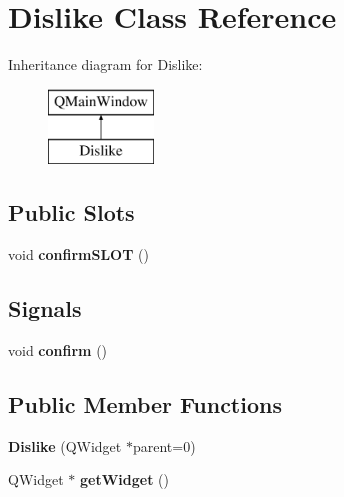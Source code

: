\hypertarget{class_dislike}{}\section{Dislike Class Reference}
\label{class_dislike}
Inheritance diagram for Dislike\+:\begin{figure}[H]
\begin{center}
\leavevmode
\includegraphics[height=2.000000cm]{class_dislike}
\end{center}
\end{figure}
\subsection*{Public Slots}
\begin{DoxyCompactItemize}
\item 
void {\bfseries confirm\+S\+L\+OT} ()\hypertarget{class_dislike_a16fb4a4bf8f204defa9922e4265b4466}{}\label{class_dislike_a16fb4a4bf8f204defa9922e4265b4466}

\end{DoxyCompactItemize}
\subsection*{Signals}
\begin{DoxyCompactItemize}
\item 
void {\bfseries confirm} ()\hypertarget{class_dislike_a94261e16aa4204d2371c2984366336a7}{}\label{class_dislike_a94261e16aa4204d2371c2984366336a7}

\end{DoxyCompactItemize}
\subsection*{Public Member Functions}
\begin{DoxyCompactItemize}
\item 
{\bfseries Dislike} (Q\+Widget $\ast$parent=0)\hypertarget{class_dislike_aa894589b24751604c1cd4bc0c17422c1}{}\label{class_dislike_aa894589b24751604c1cd4bc0c17422c1}

\item 
Q\+Widget $\ast$ {\bfseries get\+Widget} ()\hypertarget{class_dislike_a342d9eb50e6b382ca8d321517b266375}{}\label{class_dislike_a342d9eb50e6b382ca8d321517b266375}

\end{DoxyCompactItemize}
